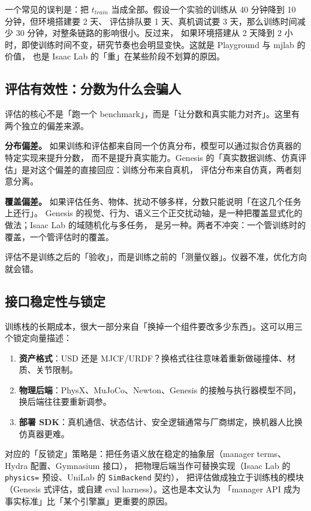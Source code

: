 \documentclass[UTF8, 11pt, a4paper, fontset=windows]{ctexart}
\newcommand{\term}[1]{\texttt{#1}}
\begin{document}
一个常见的误判是：把 $t_{train}$ 当成全部。假设一个实验的训练从 40 分钟降到 10 分钟，但环境搭建要 2 天、
评估排队要 1 天、真机调试要 3 天，那么训练时间减少 30 分钟，对整条链路的影响很小。反过来，
如果环境搭建从 2 天降到 2 小时，即使训练时间不变，研究节奏也会明显变快。这就是 Playground 与 mjlab 的价值，
也是 Isaac Lab 的「重」在某些阶段不划算的原因。

\subsection{评估有效性：分数为什么会骗人}

评估的核心不是「跑一个 benchmark」，而是「让分数和真实能力对齐」。这里有两个独立的偏差来源。

\textbf{分布偏差。} 如果训练和评估都来自同一个仿真分布，模型可以通过拟合仿真器的特定实现来提升分数，
而不是提升真实能力。Genesis 的「真实数据训练、仿真评估」是对这个偏差的直接回应：训练分布来自真机，
评估分布来自仿真，两者刻意分离。

\textbf{覆盖偏差。} 如果评估任务、物体、扰动不够多样，分数只能说明「在这几个任务上还行」。
Genesis 的视觉、行为、语义三个正交扰动轴，是一种把覆盖显式化的做法；Isaac Lab 的域随机化与多任务，
是另一种。两者不冲突：一个管训练时的覆盖，一个管评估时的覆盖。

\begin{judgement}
评估不是训练之后的「验收」，而是训练之前的「测量仪器」。仪器不准，优化方向就会错。
\end{judgement}

\subsection{接口稳定性与锁定}

训练栈的长期成本，很大一部分来自「换掉一个组件要改多少东西」。这可以用三个锁定向量描述：

\begin{enumerate}
  \item \textbf{资产格式}：USD 还是 MJCF/URDF？换格式往往意味着重新做碰撞体、材质、关节限制。
  \item \textbf{物理后端}：PhysX、MuJoCo、Newton、Genesis 的接触与执行器模型不同，换后端往往要重新调参。
  \item \textbf{部署 SDK}：真机通信、状态估计、安全逻辑通常与厂商绑定，换机器人比换仿真器更难。
\end{enumerate}

对应的「反锁定」策略是：把任务语义放在稳定的抽象层（manager terms、Hydra 配置、Gymnasium 接口），
把物理后端当作可替换实现（Isaac Lab 的 \term{physics=} 预设、UniLab 的 \term{SimBackend} 契约），
把评估做成独立于训练栈的模块（Genesis 式评估，或自建 eval harness）。这也是本文认为
「manager API 成为事实标准」比「某个引擎赢」更重要的原因。
\end{document}
